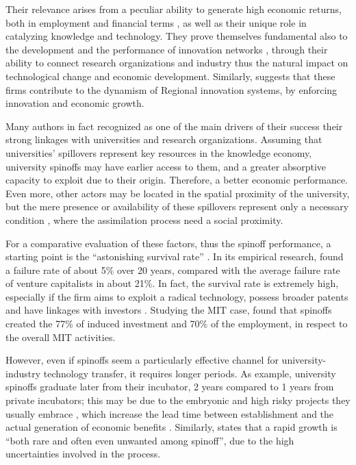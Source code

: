 Their relevance arises from a peculiar ability to generate high economic returns, both in employment and financial terms \citep{OShea2004}, as well as their unique role in catalyzing knowledge and technology. They prove themselves fundamental also to the development and the performance of innovation networks \citep{Perez2003}, through their ability to connect research organizations and industry \citep{Rizzo2015} thus the natural impact on technological change and economic development. Similarly, \citet{Perez2003} suggests that these firms contribute to the dynamism of Regional innovation systems, by enforcing innovation and economic growth.

Many authors in fact recognized as one of the main drivers of their success their strong linkages with universities and research organizations. Assuming that universities' spillovers represent key resources in the knowledge economy, university spinoffs may have earlier access to them, and a greater absorptive capacity to exploit due to their origin. Therefore, a better economic performance. Even more, other actors may be located in the spatial proximity of the university, but the mere presence or availability of these spillovers represent only a necessary condition \citep{Colombo2010}, where the assimilation process need a social proximity.

For a comparative evaluation of these factors, thus the spinoff performance, a starting point is the \enquote{astonishing survival rate} \citep{Balderi2007}. In its empirical research, \citet{Leitch2005} found a failure rate of about 5\% over 20 years, compared with the average failure rate of venture capitalists in about 21\%. In fact, the survival rate is extremely high, especially if the firm aims to exploit a radical technology, possess broader patents and have linkages with investors \citep{OShea2004}. Studying the MIT case, \citet{Rogers2001} found that spinoffs created the 77\% of induced investment and 70\% of the employment, in respect to the overall MIT activities.

However, even if spinoffs seem a particularly effective channel for university- industry technology transfer, it requires longer periods. As example, university spinoffs graduate later from their incubator, 2 years compared to 1 years from private incubators; this may be due to the embryonic and high risky projects they usually embrace \citep{Rothaermel2005}, which increase the lead time between establishment and the actual generation of economic benefits \citep{Leitch2005}. Similarly, \citet{Perez2003} states that a rapid growth is \enquote{both rare and often even unwanted among spinoff}, due to the high uncertainties involved in the process.

